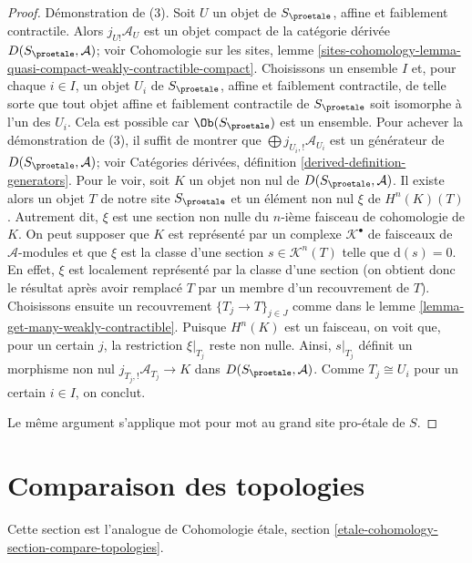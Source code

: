 \begin{proof}
Démonstration de (3). Soit $U$ un objet de $S_\proetale$, affine et
faiblement contractile. Alors $j_{U!}\mathcal{A}_U$ est un objet compact
de la catégorie dérivée $D(S_\proetale, \mathcal{A})$; voir
Cohomologie sur les sites, lemme
\ref{sites-cohomology-lemma-quasi-compact-weakly-contractible-compact}.
Choisissons un ensemble $I$ et, pour chaque $i \in I$, un objet
$U_i$ de $S_\proetale$, affine et faiblement contractile, de telle sorte que tout objet affine et faiblement contractile
de $S_\proetale$ soit isomorphe à l'un des $U_i$. Cela est possible
car $\Ob(S_\proetale)$ est un ensemble. Pour achever la démonstration de (3), il suffit
de montrer que $\bigoplus j_{U_i, !}\mathcal{A}_{U_i}$ est un générateur
de $D(S_\proetale, \mathcal{A})$; voir
Catégories dérivées, définition \ref{derived-definition-generators}.
Pour le voir, soit $K$ un objet non nul
de $D(S_\proetale, \mathcal{A})$. Il existe alors un objet $T$
de notre site $S_\proetale$ et un élément non nul $\xi$ de $H^n(K)(T)$.
Autrement dit, $\xi$ est une section non nulle du $n$-ième faisceau de cohomologie
de $K$.
On peut supposer que $K$ est représenté par un complexe $\mathcal{K}^\bullet$
de faisceaux de $\mathcal{A}$-modules et que $\xi$ est la classe d'une
section $s \in \mathcal{K}^n(T)$ telle que $\text{d}(s) = 0$.
En effet, $\xi$ est localement représenté par la classe d'une section
(on obtient donc le résultat après avoir remplacé $T$ par un membre d'un recouvrement de $T$).
Choisissons ensuite un recouvrement $\{T_j \to T\}_{j \in J}$
comme dans le lemme \ref{lemma-get-many-weakly-contractible}.
Puisque $H^n(K)$ est un faisceau, on voit que, pour un certain $j$, la restriction
$\xi|_{T_j}$ reste non nulle. Ainsi, $s|_{T_j}$ définit un morphisme non nul
$j_{T_j, !}\mathcal{A}_{T_j} \to K$ dans $D(S_\proetale, \mathcal{A})$.
Comme $T_j \cong U_i$ pour un certain $i \in I$, on conclut.

\medskip\noindent
Le même argument s'applique mot pour mot au grand site pro-\'etale de $S$.
\end{proof}







\section{Comparaison des topologies}
\label{section-compare-topologies}

\noindent
Cette section est l'analogue de
Cohomologie \'etale, section \ref{etale-cohomology-section-compare-topologies}.

